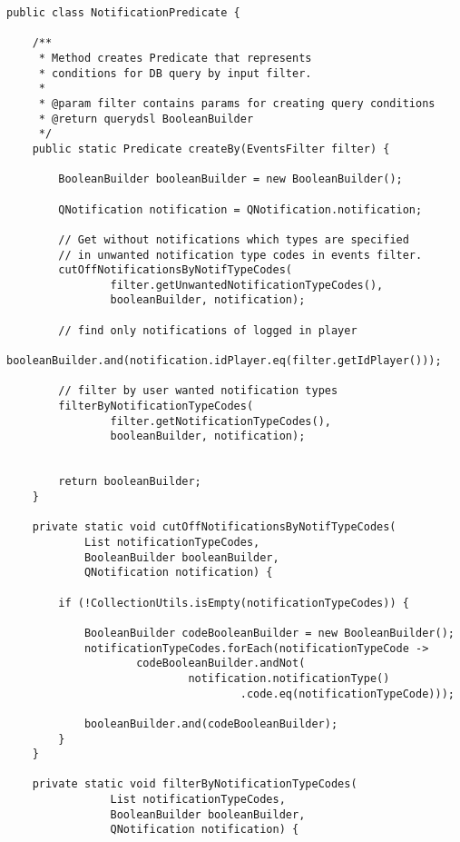 \documentclass[twoside, 12pt]{article}
\begin{document}
{{\clearpage


\begin{lstlisting}
public class NotificationPredicate {

    /**
     * Method creates Predicate that represents
     * conditions for DB query by input filter.
     *
     * @param filter contains params for creating query conditions
     * @return querydsl BooleanBuilder
     */
    public static Predicate createBy(EventsFilter filter) {

        BooleanBuilder booleanBuilder = new BooleanBuilder();

        QNotification notification = QNotification.notification;

        // Get without notifications which types are specified
        // in unwanted notification type codes in events filter.
        cutOffNotificationsByNotifTypeCodes(
                filter.getUnwantedNotificationTypeCodes(),
                booleanBuilder, notification);

        // find only notifications of logged in player
        booleanBuilder.and(notification.idPlayer.eq(filter.getIdPlayer()));

        // filter by user wanted notification types
        filterByNotificationTypeCodes(
                filter.getNotificationTypeCodes(),
                booleanBuilder, notification);


        return booleanBuilder;
    }

    private static void cutOffNotificationsByNotifTypeCodes(
            List notificationTypeCodes,
            BooleanBuilder booleanBuilder,
            QNotification notification) {

        if (!CollectionUtils.isEmpty(notificationTypeCodes)) {

            BooleanBuilder codeBooleanBuilder = new BooleanBuilder();
            notificationTypeCodes.forEach(notificationTypeCode ->
                    codeBooleanBuilder.andNot(
                            notification.notificationType()
                                    .code.eq(notificationTypeCode)));

            booleanBuilder.and(codeBooleanBuilder);
        }
    }

    private static void filterByNotificationTypeCodes(
                List notificationTypeCodes,
                BooleanBuilder booleanBuilder,
                QNotification notification) {


\end{lstlisting}}}
\end{document}
